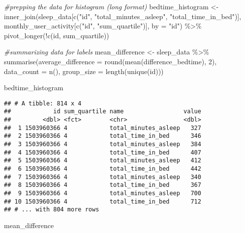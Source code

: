 \documentclass[
]{article}
\newenvironment{Shaded}{\begin{snugshade}}{\end{snugshade}}
\newcommand{\AttributeTok}[1]{\textcolor[rgb]{0.77,0.63,0.00}{#1}}
\newcommand{\CommentTok}[1]{\textcolor[rgb]{0.56,0.35,0.01}{\textit{#1}}}
\newcommand{\DecValTok}[1]{\textcolor[rgb]{0.00,0.00,0.81}{#1}}
\newcommand{\FunctionTok}[1]{\textcolor[rgb]{0.00,0.00,0.00}{#1}}
\newcommand{\NormalTok}[1]{#1}
\newcommand{\OtherTok}[1]{\textcolor[rgb]{0.56,0.35,0.01}{#1}}
\newcommand{\SpecialCharTok}[1]{\textcolor[rgb]{0.00,0.00,0.00}{#1}}
\newcommand{\StringTok}[1]{\textcolor[rgb]{0.31,0.60,0.02}{#1}}
\begin{document}
\begin{Shaded}
\begin{Highlighting}[]
 \CommentTok{\#prepping the data for histogram (long format)}
\NormalTok{ bedtime\_histogram }\OtherTok{\textless{}{-}} 
   \FunctionTok{inner\_join}\NormalTok{(sleep\_data[}\FunctionTok{c}\NormalTok{(}\StringTok{"id"}\NormalTok{, }\StringTok{"total\_minutes\_asleep"}\NormalTok{, }\StringTok{"total\_time\_in\_bed"}\NormalTok{)], monthly\_user\_activity[}\FunctionTok{c}\NormalTok{(}\StringTok{"id"}\NormalTok{, }\StringTok{"sum\_quartile"}\NormalTok{)], }\AttributeTok{by =} \StringTok{"id"}\NormalTok{) }\SpecialCharTok{\%\textgreater{}\%}
   \FunctionTok{pivot\_longer}\NormalTok{(}\SpecialCharTok{!}\FunctionTok{c}\NormalTok{(id, sum\_quartile))}
 
 \CommentTok{\#summarizing data for labels}
\NormalTok{ mean\_difference }\OtherTok{\textless{}{-}}\NormalTok{ sleep\_data }\SpecialCharTok{\%\textgreater{}\%}
   \FunctionTok{summarise}\NormalTok{(}\AttributeTok{average\_difference =} \FunctionTok{round}\NormalTok{(}\FunctionTok{mean}\NormalTok{(difference\_bedtime), }\DecValTok{2}\NormalTok{),}
             \AttributeTok{data\_count =} \FunctionTok{n}\NormalTok{(),}
             \AttributeTok{group\_size =} \FunctionTok{length}\NormalTok{(}\FunctionTok{unique}\NormalTok{(id)))}
 

\NormalTok{    bedtime\_histogram}
\end{Highlighting}
\end{Shaded}

\begin{verbatim}
## # A tibble: 814 x 4
##            id sum_quartile name                 value
##         <dbl> <fct>        <chr>                <dbl>
##  1 1503960366 4            total_minutes_asleep   327
##  2 1503960366 4            total_time_in_bed      346
##  3 1503960366 4            total_minutes_asleep   384
##  4 1503960366 4            total_time_in_bed      407
##  5 1503960366 4            total_minutes_asleep   412
##  6 1503960366 4            total_time_in_bed      442
##  7 1503960366 4            total_minutes_asleep   340
##  8 1503960366 4            total_time_in_bed      367
##  9 1503960366 4            total_minutes_asleep   700
## 10 1503960366 4            total_time_in_bed      712
## # ... with 804 more rows
\end{verbatim}

\begin{Shaded}
\begin{Highlighting}[]
\NormalTok{    mean\_difference}
\end{Highlighting}
\end{Shaded}
\end{document}
